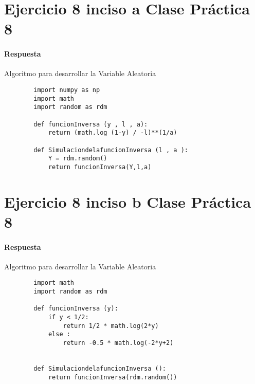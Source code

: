 \documentclass{article}
\begin{document}
    \section*{Ejercicio 8 inciso a Clase Pr\'actica 8}

    \paragraph{Respuesta}Algoritmo para desarrollar la Variable Aleatoria 

    \begin{verbatim}
        import numpy as np 
        import math
        import random as rdm

        def funcionInversa (y , l , a):
            return (math.log (1-y) / -l)**(1/a)

        def SimulaciondelafuncionInversa (l , a ):
            Y = rdm.random()
            return funcionInversa(Y,l,a)
    \end{verbatim}

    \section*{Ejercicio 8 inciso b Clase Pr\'actica 8}

    \paragraph{Respuesta}Algoritmo para desarrollar la Variable Aleatoria 

    \begin{verbatim}
        import math
        import random as rdm

        def funcionInversa (y):
            if y < 1/2:
                return 1/2 * math.log(2*y)
            else :
                return -0.5 * math.log(-2*y+2) 


        def SimulaciondelafuncionInversa ():
            return funcionInversa(rdm.random())
    \end{verbatim}
\end{document}
